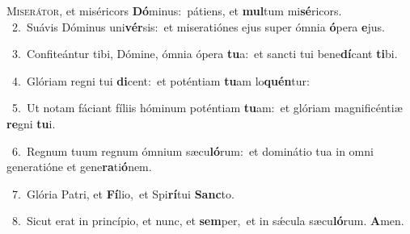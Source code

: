 \lettrine{\initial\textcolor{\initialcolor}{M}}{iserátor,} et miséricors \textbf{Dó}\-minus:~\star pátiens, et \textbf{mul}\-tum mi\-\textbf{sé}\-ricors.\\
{\numbfont\textcolor{\numbcolor}{~2.}}~Suávis Dóminus uni\-\textbf{vér}\-sis:~\star et miseratiónes ejus super ómnia \textbf{ó}\-pera \textbf{e}\-jus.\par
{\numbfont\textcolor{\numbcolor}{~3.}}~Confiteántur tibi, Dómine, ómnia ópera \textbf{tu}\-a:~\star et sancti tui bene\-\textbf{dí}\-cant \textbf{ti}\-bi.\par
{\numbfont\textcolor{\numbcolor}{~4.}}~Glóriam regni tui \textbf{di}\-cent:~\star et poténtiam \textbf{tu}\-am lo\-\textbf{quén}\-tur:\par
{\numbfont\textcolor{\numbcolor}{~5.}}~Ut notam fáciant fíliis hóminum poténtiam \textbf{tu}\-am:~\star et glóriam magnificéntiæ \textbf{re}\-gni \textbf{tu}\-i.\par
{\numbfont\textcolor{\numbcolor}{~6.}}~Regnum tuum regnum ómnium sæcu\-\textbf{ló}\-rum:~\star et dominátio tua in omni generatióne et gene\-\textbf{ra}\-ti\-\textbf{ó}\-nem.\par
{\numbfont\textcolor{\numbcolor}{~7.}}~Glória Patri, et \textbf{Fí}\-lio,~\star et Spi\-\textbf{rí}\-tui \textbf{Sanc}\-to.\par
{\numbfont\textcolor{\numbcolor}{~8.}}~Sicut erat in princípio, et nunc, et \textbf{sem}\-per,~\star et in sǽcula sæcu\-\textbf{ló}\-rum. \textbf{A}\-men.\par

